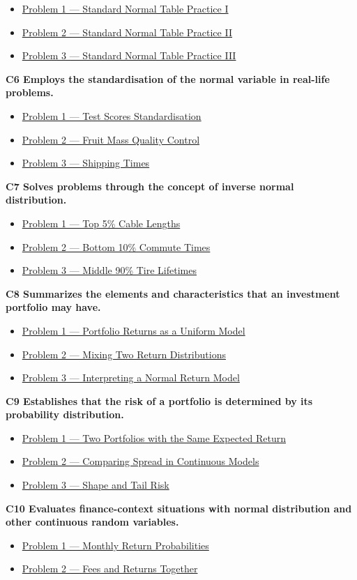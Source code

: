 	\begin{itemize}
		\item \hyperlink{c5-ex1}{Problem 1 — Standard Normal Table Practice I}
		\item \hyperlink{c5-ex2}{Problem 2 — Standard Normal Table Practice II}
		\item \hyperlink{c5-ex3}{Problem 3 — Standard Normal Table Practice III}
	\end{itemize}
	\noindent\textbf{C6 Employs the standardisation of the normal variable in real-life problems.}
	\begin{itemize}
		\item \hyperlink{c6-ex1}{Problem 1 — Test Scores Standardisation}
		\item \hyperlink{c6-ex2}{Problem 2 — Fruit Mass Quality Control}
		\item \hyperlink{c6-ex3}{Problem 3 — Shipping Times}
	\end{itemize}
	\noindent\textbf{C7 Solves problems through the concept of inverse normal distribution.}
	\begin{itemize}
		\item \hyperlink{c7-ex1}{Problem 1 — Top 5\% Cable Lengths}
		\item \hyperlink{c7-ex2}{Problem 2 — Bottom 10\% Commute Times}
		\item \hyperlink{c7-ex3}{Problem 3 — Middle 90\% Tire Lifetimes}
	\end{itemize}
	\noindent\textbf{C8 Summarizes the elements and characteristics that an investment portfolio may have.}
	\begin{itemize}
		\item \hyperlink{c8-ex1}{Problem 1 — Portfolio Returns as a Uniform Model}
		\item \hyperlink{c8-ex2}{Problem 2 — Mixing Two Return Distributions}
		\item \hyperlink{c8-ex3}{Problem 3 — Interpreting a Normal Return Model}
	\end{itemize}
	\noindent\textbf{C9 Establishes that the risk of a portfolio is determined by its probability distribution.}
	\begin{itemize}
		\item \hyperlink{c9-ex1}{Problem 1 — Two Portfolios with the Same Expected Return}
		\item \hyperlink{c9-ex2}{Problem 2 — Comparing Spread in Continuous Models}
		\item \hyperlink{c9-ex3}{Problem 3 — Shape and Tail Risk}
	\end{itemize}
	\noindent\textbf{C10 Evaluates finance-context situations with normal distribution and other continuous random variables.}
	\begin{itemize}
		\item \hyperlink{c10-ex1}{Problem 1 — Monthly Return Probabilities}
		\item \hyperlink{c10-ex2}{Problem 2 — Fees and Returns Together}
	\end{itemize}
	
